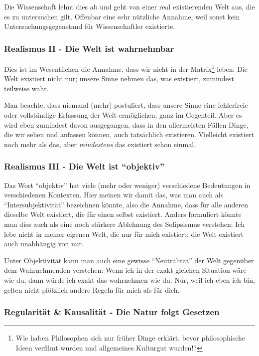 Die Wissenschaft lehnt dies ab und geht von einer real existierenden Welt aus, die es zu untersuchen gilt. Offenbar
eine sehr nützliche Annahme, weil sonst kein Untersuchungsgegenstand für Wissenschaftler existierte.

\subsubsection{Realismus II - Die Welt ist wahrnehmbar}

Dies ist im Wesentlichen die Annahme, dass wir nicht in der Matrix\footnote
{Wie haben Philosophen sich nur früher Dinge erklärt,
    bevor philosophische Ideen verfilmt wurden und allgemeines Kulturgut wurden!?}
leben: Die Welt existiert nicht nur; unsere Sinne nehmen das, was existiert, zumindest teilweise wahr.

Man beachte, dass niemand (mehr) postuliert, dass unsere Sinne eine fehlerfreie oder vollständige Erfassung der Welt
ermöglichen; ganz im Gegenteil. Aber es wird eben zumindest davon ausgegangen, dass in den allermeisten Fällen
Dinge, die wir sehen und anfassen können, auch tatsächlich existieren. Vielleicht existiert noch mehr als das, aber
\emph{mindestens} das existiert schon einmal.

\subsubsection{Realismus III - Die Welt ist \enquote{objektiv}}

Das Wort \enquote{objektiv}
hat viele (mehr oder weniger) verschiedene Bedeutungen in verschiedenen Kontexten. Hier meinen wir damit das, was
man auch als \enquote{Intersubjektivität}
bezeichnen könnte, also die Annahme, dass für alle anderen dieselbe Welt existiert, die für einen selbst existiert.
Anders formuliert könnte man dies auch als eine noch stärkere Ablehnung des Solipsismus verstehen: Ich lebe nicht in meiner
eigenen Welt, die nur für mich existiert; die Welt existiert auch unabhängig von mir.

Unter Objektivität kann man auch eine gewisse \enquote{Neutralität} der Welt gegenüber dem Wahrnehmenden verstehen: Wenn ich in der exakt gleichen Situation wäre wie du, dann würde ich exakt das wahrnehmen wie du. Nur, weil ich eben ich bin, gelten nicht plötzlich andere Regeln für mich als für dich.

\subsubsection{Regularität \& Kausalität - Die Natur folgt Gesetzen}


